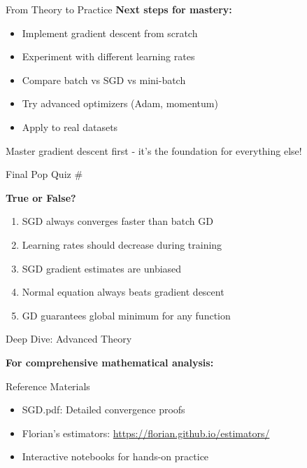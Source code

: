 \documentclass[usenames,dvipsnames]{beamer}
\begin{document}
  \begin{frame}{From Theory to Practice}
    \textbf{Next steps for mastery:}
    \begin{itemize}[<+->]
        \item Implement gradient descent from scratch
        \item Experiment with different learning rates
        \item Compare batch vs SGD vs mini-batch
        \item Try advanced optimizers (Adam, momentum)
        \item Apply to real datasets
    \end{itemize}
    
    \pause
    \begin{keypointsbox}{}
    Master gradient descent first - it's the foundation for everything else!
    \end{keypointsbox}
  \end{frame}

  \begin{frame}{Final Pop Quiz \#\thepopquiz}
    \begin{popquizbox}{\thepopquiz}
    \textbf{True or False?}
    \begin{enumerate}
        \item SGD always converges faster than batch GD
        \item Learning rates should decrease during training  
        \item SGD gradient estimates are unbiased
        \item Normal equation always beats gradient descent
        \item GD guarantees global minimum for any function
    \end{enumerate}
    \end{popquizbox}
  \end{frame}

  \begin{frame}{Deep Dive: Advanced Theory}
    \begin{center}
    \textbf{For comprehensive mathematical analysis:}
    \end{center}
    
    \begin{alertbox}{Reference Materials}
    \begin{itemize}
        \item SGD.pdf: Detailed convergence proofs  
        \item Florian's estimators: \url{https://florian.github.io/estimators/}
        \item Interactive notebooks for hands-on practice
    \end{itemize}
    \end{alertbox}
  \end{frame}
\end{document}
